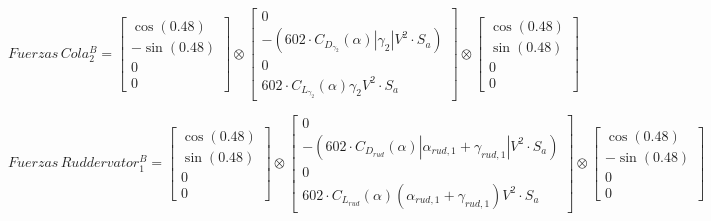 \documentclass{article}
\begin{document}
\[
  Fuerzas\,Cola_2^B = \begin{bmatrix}
                        \cos(0.48)  \\[6pt]
                        -\sin(0.48) \\[6pt]
                        0           \\[6pt]
                        0
                      \end{bmatrix}
  \otimes \begin{bmatrix}
            0                                                                           \\[6pt]
            -(602 \cdot C_{D_{\gamma_{2}}}(\alpha)\left| \gamma_2 \right|V^2 \cdot S_a) \\[6pt]
            0                                                                           \\[6pt]
            602 \cdot C_{L_{\gamma_{2}}}(\alpha)\gamma_2 V^2 \cdot S_a
          \end{bmatrix}
  \otimes \begin{bmatrix}
            \cos(0.48) \\[6pt]
            \sin(0.48) \\[6pt]
            0          \\[6pt]
            0
          \end{bmatrix}
\]

\[
  Fuerzas\,Ruddervator_1^B = \begin{bmatrix}
                               \cos(0.48) \\[6pt]
                               \sin(0.48) \\[6pt]
                               0          \\[6pt]
                               0
                             \end{bmatrix}
  \otimes \begin{bmatrix}
            0                                                                                           \\[6pt]
            -(602 \cdot C_{D_{rud}}(\alpha)\left| \alpha_{rud,1} + \gamma_{rud,1} \right|V^2 \cdot S_a) \\[6pt]
            0                                                                                           \\[6pt]
            602 \cdot C_{L_{rud}}(\alpha)(\alpha_{rud,1} + \gamma_{rud,1}) V^2 \cdot S_a
          \end{bmatrix}
  \otimes \begin{bmatrix}
            \cos(0.48)  \\[6pt]
            -\sin(0.48) \\[6pt]
            0           \\[6pt]
            0
          \end{bmatrix}
\]
\end{document}
